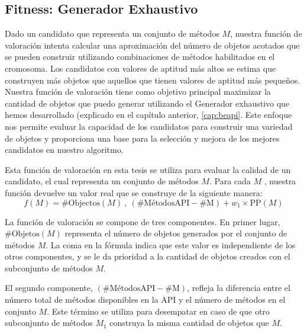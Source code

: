



\subsection{Fitness: Generador Exhaustivo}

Dado un candidato que representa un conjunto de métodos $M$, nuestra función de valoración intenta calcular una aproximación del número de objetos acotados que se pueden construir utilizando combinaciones de métodos habilitados en el cromosoma. Los candidatos con valores de aptitud más altos se estima que construyen más objetos que aquellos que tienen valores de aptitud más pequeños.
Nuestra función de valoración tiene como objetivo principal maximizar la cantidad de objetos que puedo generar utilizando el Generador exhaustivo que hemos desarrollado (explicado en el capítulo anterior,  \ref{cap:beapi}. Este enfoque nos permite evaluar la capacidad de los candidatos para construir una variedad de objetos y proporciona una base para la selección y mejora de los mejores candidatos en nuestro algoritmo.

Esta función de valoración en esta tesis se utiliza para evaluar la calidad de un candidato, el cual representa un conjunto de métodos $M$. Para cada $M$ , nuestra función devuelve un valor real que se construye de la siguiente manera:
{\small
\[
f(M) = \text{{\#Objectos}}(M) \ , \ (\text{{\#MétodosAPI}} - \text{{\#M}}) + w_1 \times \text{{PP}}(M)
\]
}

La función de valoración se compone de tres componentes. En primer lugar, $\text{{\#Objetos}}(M)$ representa el número de objetos generados por el conjunto de métodos $M$. La coma en la fórmula indica que este valor es independiente de los otros componentes, y se le da prioridad a la cantidad de objetos creados con el subconjunto de métodos $M$.

El segundo componente, $(\text{{\#MétodosAPI}} - \text{{\#M}})$, refleja la diferencia entre el número total de métodos disponibles en la API y el número de métodos en el conjunto $M$. Este término se utiliza para desempatar en caso de que otro subconjunto de métodos $M_1$ construya la misma cantidad de objetos que $M$.

